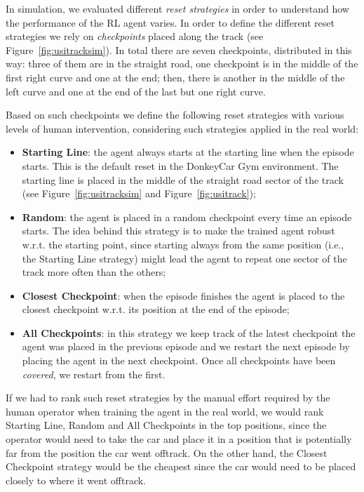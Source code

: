 In simulation, we evaluated different \textit{reset strategies} in order to understand how the performance of the RL agent varies. In order to define the different reset strategies we rely on \textit{checkpoints} placed along the track (see Figure~\ref{fig:usitracksim}). In total there are seven checkpoints, distributed in this way: three of them are in the straight road, one checkpoint is in the middle of the first right curve and one at the end; then, there is another in the middle of the left curve and one at the end of the last but one right curve. 

Based on such checkpoints we define the following reset strategies with various levels of human intervention, considering such strategies applied in the real world:

\begin{itemize}
	\item \textbf{Starting Line}: the agent always starts at the starting line when the episode starts. This is the default reset in the DonkeyCar Gym environment. The starting line is placed in the middle of the straight road sector of the track (see Figure~\ref{fig:usitracksim} and Figure~\ref{fig:usitrack}); 
	\item \textbf{Random}: the agent is placed in a random checkpoint every time an episode starts. The idea behind this strategy is to make the trained agent robust w.r.t. the starting point, since starting always from the same position (i.e., the Starting Line strategy) might lead the agent to repeat one sector of the track more often than the others;
	\item \textbf{Closest Checkpoint}: when the episode finishes the agent is placed to the closest checkpoint w.r.t. its position at the end of the episode;
	\item \textbf{All Checkpoints}: in this strategy we keep track of the latest checkpoint the agent was placed in the previous episode and we restart the next episode by placing the agent in the next checkpoint. Once all checkpoints have been \textit{covered}, we restart from the first.
\end{itemize}

If we had to rank such reset strategies by the manual effort required by the human operator when training the agent in the real world, we would rank Starting Line, Random and All Checkpoints in the top positions, since the operator would need to take the car and place it in a position that is potentially far from the position the car went offtrack. On the other hand, the Closest Checkpoint strategy would be the cheapest since the car would need to be placed closely to where it went offtrack.

